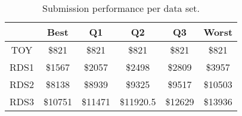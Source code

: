 \begin{table}
\footnotesize
\caption{Submission performance per data set.}
\centering
\begin{tabular}{c||c|c|c|c|c}
\hline \hline
                 & Best                 & Q1                 & Q2                & Q3                & Worst \\ 
\hline
TOY & \$821   & \$821   & \$821  & \$821  & \$821 \\
\hline
RDS1 & \$1567   & \$2057   & \$2498  & \$2809  & \$3957 \\
\hline
RDS2 & \$8138   & \$8939   & \$9325  & \$9517  & \$10503 \\
\hline
RDS3 & \$10751   & \$11471   & \$11920.5  & \$12629  & \$13936 \\
\end{tabular} 
\label{table:result} 
\end{table}